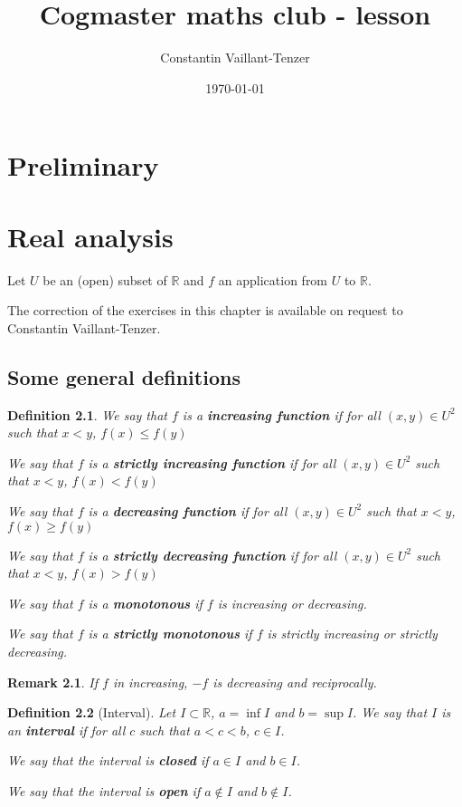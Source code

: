 \documentclass[french,12pt,a4paper]{book}
\title{Cogmaster maths club - lesson}
\date{\today}
\author{Constantin Vaillant-Tenzer}
\affil{École Normale Supérieure - PSL, Université de Paris \\ constantin.tenzer@ens.psl.eu}
\newcommand{\R}{\mathbb{R}}
\newtheorem{defin}{Definition}[chapter]
\newtheorem{rem}{Remark}[chapter]
\numberwithin{equation}{chapter}
\begin{document}
\maketitle

\tableofcontents

\chapter{Preliminary}

\chapter{Real analysis}

Let $U$ be an (open) subset of $\R$ and $f$ an application from $U$ to $\R$. 

 The correction of the exercises in this chapter is available on request to Constantin Vaillant-Tenzer. 

\section{Some general definitions}

\begin{defin}
We say that $f$ is a \textbf{increasing function} if for all $(x,y) \in U^2$ such that $x < y$, $f(x) \leq f(y)$

We say that $f$ is a \textbf{strictly increasing function} if for all $(x,y) \in U^2$ such that $x < y$, $f(x) < f(y)$

We say that $f$ is a\textbf{ decreasing function} if for all $(x,y) \in U^2$ such that $x < y$, $f(x) \geq f(y)$

We say that $f$ is a \textbf{strictly decreasing function }if for all $(x,y) \in U^2$ such that $x < y$, $f(x) > f(y)$

We say that $f$ is a \textbf{monotonous} if $f$ is increasing or decreasing. 

We say that $f$ is a \textbf{strictly monotonous} if $f$ is strictly increasing or strictly decreasing. 
\end{defin}

\begin{rem}
If $f$ in increasing, $-f$ is decreasing and reciprocally. 
\end{rem}

\begin{defin}[Interval]
Let $I \subset \R$, $a = \inf I$ and $b = \sup I$.  We say that $I$ is an \textbf{interval} if for all $c$ such that $a < c < b$, $c \in I$.

We say that the interval is \textbf{closed }if $a \in I$ and $b \in I$.

We say that the interval is \textbf{open }if $a \notin I$ and $b \notin I$.
\end{defin}
\end{document}
